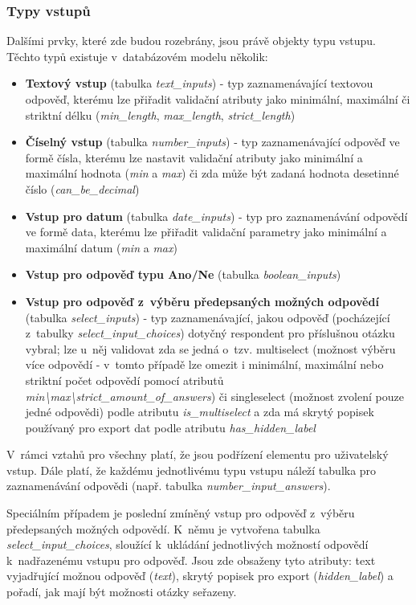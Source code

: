 	\subsubsection{Typy vstupů}
	\label{sec:form_inputs_types}
	Dalšími prvky, které zde budou rozebrány, jsou právě objekty typu vstupu. Těchto typů existuje v~databázovém modelu několik:
	
	\begin{itemize}
		\item \textbf{Textový vstup} (tabulka \textit{text\_inputs}) - typ zaznamenávající textovou odpověď, kterému lze přiřadit validační atributy jako minimální, maximální či striktní délku (\textit{min\_length}, \textit{max\_length}, \textit{strict\_length})
		\item \textbf{Číselný vstup} (tabulka \textit{number\_inputs}) - typ zaznamenávající odpověď ve formě čísla, kterému lze nastavit validační atributy jako minimální a maximální hodnota (\textit{min} a \textit{max}) či zda může být zadaná hodnota desetinné číslo (\textit{can\_be\_decimal})
		\item \textbf{Vstup pro datum} (tabulka \textit{date\_inputs}) - typ pro zaznamenávání odpovědí ve formě data, kterému lze přiřadit validační parametry jako minimální a maximální datum (\textit{min} a \textit{max})
		\item \textbf{Vstup pro odpověď typu Ano/Ne} (tabulka \textit{boolean\_inputs})
		\item \textbf{Vstup pro odpověď z~výběru předepsaných možných odpovědí} (tabulka \textit{select\_inputs}) - typ zaznamenávající, jakou odpověď (pocházející z~tabulky \textit{select\_input\_choices}) dotyčný respondent pro příslušnou otázku vybral; lze u~něj validovat zda se jedná o~tzv. multiselect (možnost výběru více odpovědí - v~tomto případě lze omezit i minimální, maximální nebo striktní počet odpovědí pomocí atributů \textit{min\textbackslash max\textbackslash strict\_amount\_of\_answers}) či singleselect (možnost zvolení pouze jedné odpovědi) podle atributu \textit{is\_multiselect} a zda má skrytý popisek používaný pro export dat podle atributu \textit{has\_hidden\_label}
	\end{itemize}
	
	V~rámci vztahů pro všechny platí, že jsou podřízení elementu pro uživatelský vstup. Dále platí, že každému jednotlivému typu vstupu náleží tabulka pro zaznamenávání odpovědi (např. tabulka \textit{number\_input\_answers}).
	
	Speciálním případem je poslední zmíněný vstup pro odpověď z~výběru předepsaných možných odpovědí. K~němu je vytvořena tabulka \textit{select\_input\_choices}, sloužící k~ukládání jednotlivých možností odpovědí k~nadřazenému vstupu pro odpověď. Jsou zde obsaženy tyto atributy: text vyjadřující možnou odpověď (\textit{text}), skrytý popisek pro export (\textit{hidden\_label}) a pořadí, jak mají být možnosti otázky seřazeny.
	
